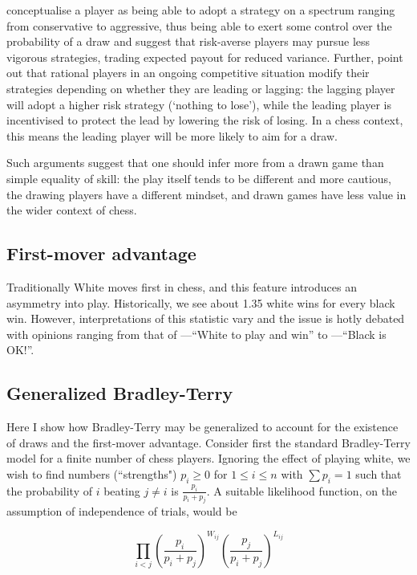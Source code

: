 \documentclass[review]{elsarticle}
\begin{document}
\citet{moul2009} conceptualise a player as being able to adopt a
strategy on a spectrum ranging from conservative to aggressive, thus
being able to exert some control over the probability of a draw and
suggest that risk-averse players may pursue less vigorous strategies,
trading expected payout for reduced variance.  Further,
\citet{langer2013} point out that rational players in an ongoing
competitive situation modify their strategies depending on whether
they are leading or lagging: the lagging player will adopt a higher
risk strategy (`nothing to lose'), while the leading player is
incentivised to protect the lead by lowering the risk of losing.  In a
chess context, this means the leading player will be more likely to
aim for a draw.

Such arguments suggest that one should infer more from a drawn game
than simple equality of skill: the play itself tends to be different
and more cautious, the drawing players have a different mindset, and
drawn games have less value in the wider context of chess.

\subsection{First-mover advantage} Traditionally White moves first in
chess, and this feature introduces an asymmetry into play.
Historically, we see about 1.35 white wins for every black win.
However, interpretations of this statistic vary and the issue is hotly
debated with opinions ranging from that of \citet{adams2007}---``White
to play and win'' to \citet{adorjan1988}---``Black is OK!''.

\subsection{Generalized Bradley-Terry}

Here I show how Bradley-Terry may be generalized to account for the
existence of draws and the first-mover advantage.  Consider first the
standard Bradley-Terry model for a finite number of chess players.
Ignoring the effect of playing white, we wish to find numbers
(``strengths") $p_i\geqslant 0$ for $1\leqslant i\leqslant n$ with
$\sum p_i=1$ such that the probability of $i$ beating $j\neq i$ is
$\frac{p_i}{p_i+p_j}$.  A suitable likelihood function, on the
assumption of independence of trials, would be

\begin{equation}
\prod_{i<j}
\left(\frac{p_i}{p_i+p_j}\right)^{W_{ij}}
\left(\frac{p_j}{p_i+p_j}\right)^{L_{ij}}
\end{equation}
\end{document}
